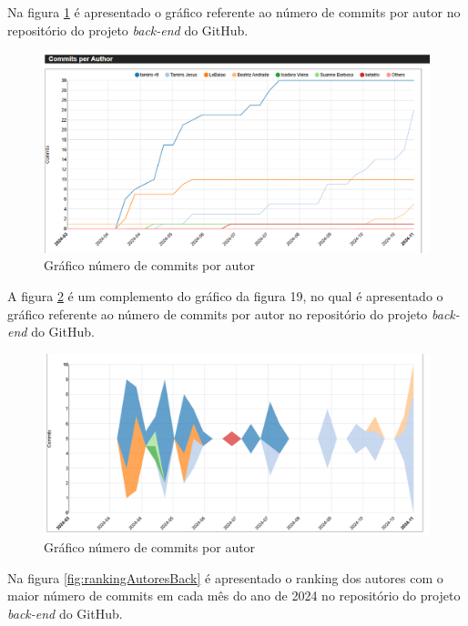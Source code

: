 Na figura \ref{fig:linhasPorAutorBack} é apresentado o gráfico referente ao número de commits por autor no repositório do projeto \textit{back-end} do GitHub.  

\begin{figure}[ht]
        \centering
\includegraphics[width=1.0\textwidth]{images/commits-autor-stats-back.png}
        \caption{Gráfico número de commits por autor}
        \label{fig:linhasPorAutorBack}
    \end{figure}

\newpage

A figura \ref{fig:linhasPorAutor2Back} é um complemento do gráfico da figura 19, no qual é apresentado o gráfico referente ao número de commits por autor no repositório do projeto \textit{back-end} do GitHub.  

\begin{figure}[ht]
        \centering
\includegraphics[width=1.0\textwidth]{images/commits-autor2-stats-back.png}
        \caption{Gráfico número de commits por autor}
        \label{fig:linhasPorAutor2Back}
    \end{figure}



Na figura \ref{fig:rankingAutoresBack} é apresentado o ranking dos autores com o maior número de commits em cada mês do ano de 2024 no repositório do projeto \textit{back-end} do GitHub.

